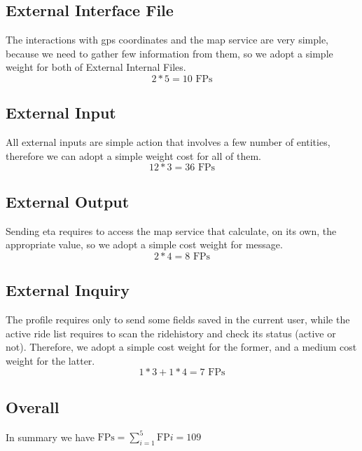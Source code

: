  \subsection{External Interface File}
  The interactions with gps coordinates and the map service are very simple, 
  because we need to gather few information from them, so we adopt a simple weight for
  both of External Internal Files.
  \begin{equation}
   2*5 = 10 \text{ FPs}
  \end{equation}
  
  \subsection{External Input}
  All external inputs are simple action that involves a few number of entities,
  therefore we can adopt a simple weight cost for all of them.
  \begin{equation}
    12*3 = 36 \text{ FPs}
  \end{equation}
  
  \subsection{External Output}
  Sending eta requires to access the map service that calculate, on its own,
  the appropriate value, so we adopt a simple cost weight for message.
  \begin{equation}
    2*4 = 8 \text{ FPs}
  \end{equation}
  
  \subsection{External Inquiry}
  The profile requires only to send some fields saved in the current user,
  while the active ride list requires to scan the ridehistory and check its status (active or not).
  Therefore, we adopt a simple cost weight for the former, and a medium cost weight for the latter.
  \begin{equation}
    1*3 + 1*4 = 7 \text{ FPs}
  \end{equation}
  
  \subsection{Overall}
  In summary we have $\text{FPs} = \sum_{i=1}^{5} \text{FP}i = 109 $
 